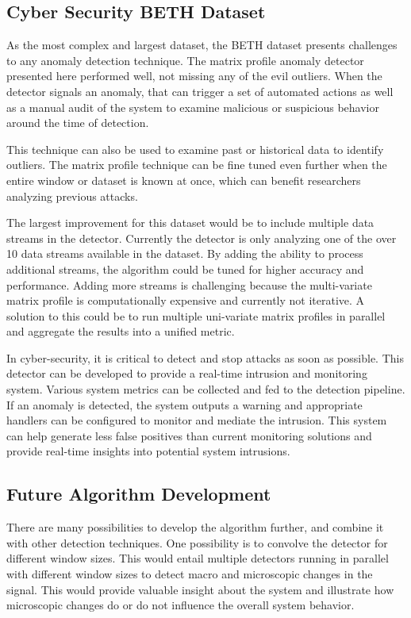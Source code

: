 \subsection{Cyber Security BETH Dataset}

As the most complex and largest dataset, the BETH dataset presents challenges to any anomaly detection technique. The matrix profile anomaly detector presented here performed well, not missing any of the evil outliers. When the detector signals an anomaly, that can trigger a set of automated actions as well as a manual audit of the system to examine malicious or suspicious behavior around the time of detection.

This technique can also be used to examine past or historical data to identify outliers. The matrix profile technique can be fine tuned even further when the entire window or dataset is known at once, which can benefit researchers analyzing previous attacks. 

The largest improvement for this dataset would be to include multiple data streams in the detector. Currently the detector is only analyzing one of the over 10 data streams available in the dataset. By adding the ability to process additional streams, the algorithm could be tuned for higher accuracy and performance. Adding more streams is challenging because the multi-variate matrix profile is computationally expensive and currently not iterative. A solution to this could be to run multiple uni-variate matrix profiles in parallel and aggregate the results into a unified metric. 

In cyber-security, it is critical to detect and stop attacks as soon as possible. This detector can be developed to provide a real-time intrusion and monitoring system. Various system metrics can be collected and fed to the detection pipeline. If an anomaly is detected, the system outputs a warning and appropriate handlers can be configured to monitor and mediate the intrusion. This system can help generate less false positives than current monitoring solutions and provide real-time insights into potential system intrusions. 

\subsection{Future Algorithm Development}
\label{ref_future_algorithm_development}

There are many possibilities to develop the algorithm further, and combine it with other detection techniques. One possibility is to convolve the detector for different window sizes. This would entail multiple detectors running in parallel with different window sizes to detect macro and microscopic changes in the signal. This would provide valuable insight about the system and illustrate how microscopic changes do or do not influence the overall system behavior.


